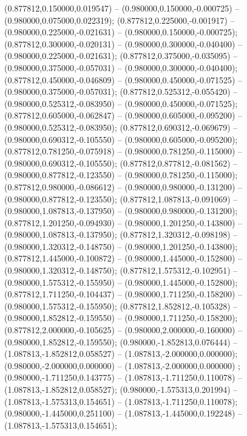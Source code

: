  (0.877812,0.150000,0.019547) -- (0.980000,0.150000,-0.000725) -- (0.980000,0.075000,0.022319);
 (0.877812,0.225000,-0.001917) -- (0.980000,0.225000,-0.021631) -- (0.980000,0.150000,-0.000725);
 (0.877812,0.300000,-0.020131) -- (0.980000,0.300000,-0.040400) -- (0.980000,0.225000,-0.021631);
 (0.877812,0.375000,-0.035095) -- (0.980000,0.375000,-0.057031) -- (0.980000,0.300000,-0.040400);
 (0.877812,0.450000,-0.046809) -- (0.980000,0.450000,-0.071525) -- (0.980000,0.375000,-0.057031);
 (0.877812,0.525312,-0.055420) -- (0.980000,0.525312,-0.083950) -- (0.980000,0.450000,-0.071525);
 (0.877812,0.605000,-0.062847) -- (0.980000,0.605000,-0.095200) -- (0.980000,0.525312,-0.083950);
 (0.877812,0.690312,-0.069679) -- (0.980000,0.690312,-0.105550) -- (0.980000,0.605000,-0.095200);
 (0.877812,0.781250,-0.075918) -- (0.980000,0.781250,-0.115000) -- (0.980000,0.690312,-0.105550);
 (0.877812,0.877812,-0.081562) -- (0.980000,0.877812,-0.123550) -- (0.980000,0.781250,-0.115000);
 (0.877812,0.980000,-0.086612) -- (0.980000,0.980000,-0.131200) -- (0.980000,0.877812,-0.123550);
 (0.877812,1.087813,-0.091069) -- (0.980000,1.087813,-0.137950) -- (0.980000,0.980000,-0.131200);
 (0.877812,1.201250,-0.094930) -- (0.980000,1.201250,-0.143800) -- (0.980000,1.087813,-0.137950);
 (0.877812,1.320312,-0.098198) -- (0.980000,1.320312,-0.148750) -- (0.980000,1.201250,-0.143800);
 (0.877812,1.445000,-0.100872) -- (0.980000,1.445000,-0.152800) -- (0.980000,1.320312,-0.148750);
 (0.877812,1.575312,-0.102951) -- (0.980000,1.575312,-0.155950) -- (0.980000,1.445000,-0.152800);
 (0.877812,1.711250,-0.104437) -- (0.980000,1.711250,-0.158200) -- (0.980000,1.575312,-0.155950);
 (0.877812,1.852812,-0.105328) -- (0.980000,1.852812,-0.159550) -- (0.980000,1.711250,-0.158200);
 (0.877812,2.000000,-0.105625) -- (0.980000,2.000000,-0.160000) -- (0.980000,1.852812,-0.159550);
 (0.980000,-1.852813,0.076444) -- (1.087813,-1.852812,0.058527) -- (1.087813,-2.000000,0.000000);
 (0.980000,-2.000000,0.000000) -- (1.087813,-2.000000,0.000000) ;
 (0.980000,-1.711250,0.143775) -- (1.087813,-1.711250,0.110078) -- (1.087813,-1.852812,0.058527);
 (0.980000,-1.575313,0.201994) -- (1.087813,-1.575313,0.154651) -- (1.087813,-1.711250,0.110078);
 (0.980000,-1.445000,0.251100) -- (1.087813,-1.445000,0.192248) -- (1.087813,-1.575313,0.154651);
